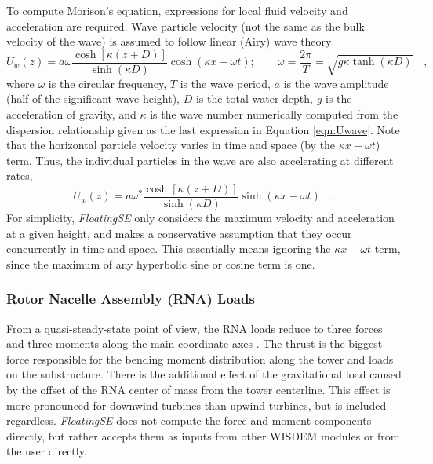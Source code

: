 To compute Morison's equation, expressions for local fluid velocity and
acceleration are required.  Wave particle velocity (not the same as the bulk
velocity of the wave) is assumed to follow linear (Airy) wave theory
\begin{equation} \label{eqn:Uwave}
U_w(z) = a\omega\frac{\cosh\left[\kappa\left(z + D \right)\right]}{\sinh\left(\kappa D\right)}\cosh\left(\kappa x -
  \omega t\right);
\qquad \omega=\frac{2\pi}{T} = \sqrt{ g \kappa \tanh\left(\kappa
    D\right) } \quad,
\end{equation}
where $\omega$ is the circular frequency, $T$ is the wave period, $a$ is
the wave amplitude (half of the significant wave height), $D$ is the
total water depth, $g$ is the acceleration of gravity, and $\kappa$ is
the wave number numerically computed from the dispersion relationship
given as the last expression in Equation \ref{eqn:Uwave}.  Note that the
horizontal particle velocity varies in time and space (by the
$\kappa x - \omega t$) term.  Thus, the individual particles in the wave
are also accelerating at different rates,
\begin{equation} \label{eqn:Awave}
\dot{U}_w(z) = a\omega^2\frac{\cosh\left[\kappa\left(z + D \right)\right]}{\sinh\left(\kappa D\right)}\sinh\left(\kappa x -
  \omega t\right)\quad.
\end{equation}
For
simplicity, \textit{FloatingSE} only considers the maximum velocity and
acceleration at a given height, and makes a conservative assumption that
they occur concurrently in time and space.  This essentially means ignoring the
$\kappa x - \omega t$ term, since the maximum of any hyperbolic sine or cosine
term is one.


\subsubsection{Rotor Nacelle Assembly (RNA) Loads}
From a quasi-steady-state point of view, the RNA loads reduce to three
forces and three moments along the main coordinate axes
\citep{JacketSE}. The thrust is the biggest force responsible for the
bending moment distribution along the tower and loads on the
substructure.  There is the additional effect of the gravitational load
caused by the offset of the RNA center of mass from the tower
centerline.  This effect is more pronounced for downwind turbines than
upwind turbines, but is included regardless.  \textit{FloatingSE} does
not compute the force and moment components directly, but rather accepts
them as inputs from other WISDEM modules or from the user directly.


